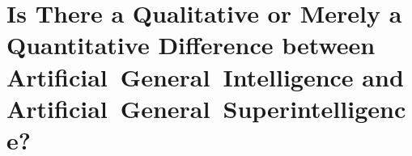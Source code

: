 \section{Is There a Qualitative or Merely a Quantitative Difference between Artificial~General~Intelligence and Artificial~General~Superintelligence?}
